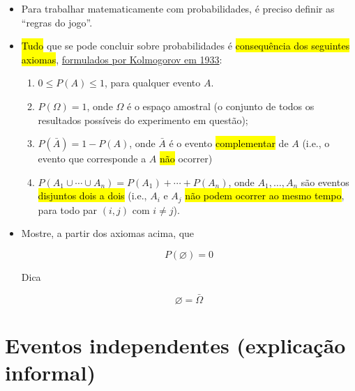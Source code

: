 \documentclass[
  11pt]{report}
\begin{document}
\begin{itemize}
\item
  Para trabalhar matematicamente com probabilidades, é preciso definir as ``regras do jogo''.
\item
  {\hl{Tudo}} que se pode concluir sobre probabilidades é {\hl{consequência dos seguintes axiomas}}, \href{https://pt.wikipedia.org/wiki/Axiomas_de_probabilidade\#Axiomas}{formulados por Kolmogorov em 1933}:

  \begin{enumerate}
  \def\labelenumi{\arabic{enumi}.}
  \item
    $0 \leq P(A) \leq 1$, para qualquer evento $A$.
  \item
    $P(\Omega) = 1$, onde $\Omega$ é o espaço amostral (o conjunto de todos os resultados possíveis do experimento em questão);
  \item
    $P(\bar A) = 1 - P(A)$, onde $\bar A$ é o evento {\hl{complementar}} de $A$ (i.e., o evento que corresponde a $A$ {\hl{não}} ocorrer)
  \item
    $P(A_1 \cup \cdots \cup A_n) = P(A_1) + \cdots + P(A_n)$, onde $A_1, \ldots, A_n$ são eventos {\hl{disjuntos dois a dois}} (i.e., $A_i$ e $A_j$ {\hl{não podem ocorrer ao mesmo tempo}}, para todo par $(i, j)$ com $i \neq j$).
  \end{enumerate}
\item
  Mostre, a partir dos axiomas acima, que

  \[
  P(\varnothing) = 0
  \]

  Dica~~\hrulefill 

  \[\varnothing = \bar \Omega \]

  \vspace{-1.5ex} \hrulefill \vspace{1ex}

\end{itemize}

\hypertarget{eventos-independentes-explicauxe7uxe3o-informal}{%
\section{Eventos independentes (explicação informal)}\label{eventos-independentes-explicauxe7uxe3o-informal}}
\end{document}
